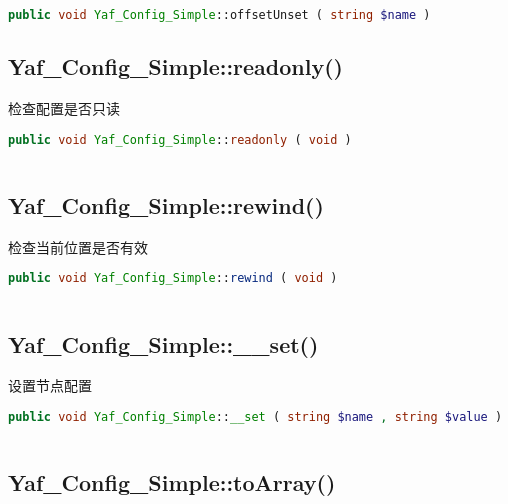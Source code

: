\begin{lstlisting}[language=PHP]
public void Yaf_Config_Simple::offsetUnset ( string $name )
\end{lstlisting}


\subsection{Yaf\_Config\_Simple::readonly()}

检查配置是否只读

\begin{lstlisting}[language=PHP]
public void Yaf_Config_Simple::readonly ( void )
\end{lstlisting}

\begin{lstlisting}[language=PHP]

\end{lstlisting}



\subsection{Yaf\_Config\_Simple::rewind()}

检查当前位置是否有效

\begin{lstlisting}[language=PHP]
public void Yaf_Config_Simple::rewind ( void )
\end{lstlisting}

\begin{lstlisting}[language=PHP]

\end{lstlisting}



\subsection{Yaf\_Config\_Simple::\_\_set()}

设置节点配置

\begin{lstlisting}[language=PHP]
public void Yaf_Config_Simple::__set ( string $name , string $value )
\end{lstlisting}

\begin{lstlisting}[language=PHP]

\end{lstlisting}



\subsection{Yaf\_Config\_Simple::toArray()}

